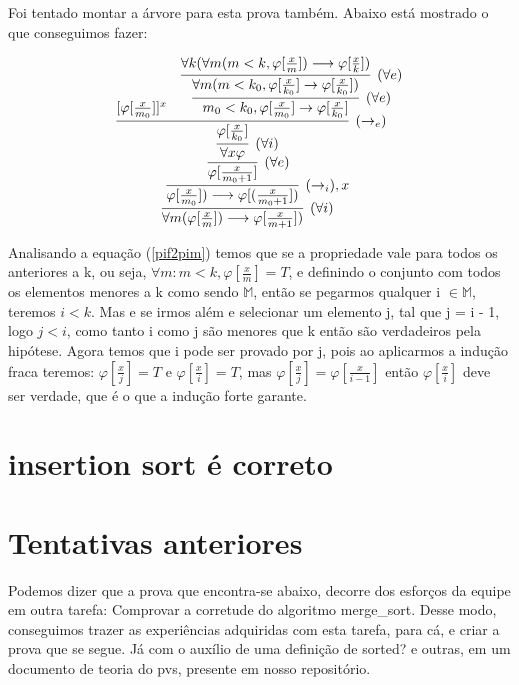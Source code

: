 \documentclass[a4paper, 10pt]{article}
\begin{document}
Foi tentado montar a árvore para esta prova também. Abaixo está mostrado o que conseguimos fazer:

$$
\infer[(\forall{i})] {\forall{m}(\varphi[\frac{x}{m}]) \longrightarrow \varphi[\frac{x}{m+1}])} {
    \infer[(\rightarrow_i), x] {\varphi[\frac{x}{m_0}]) \longrightarrow \varphi[(\frac{x}{m_0+1}])} {
        \infer[(\forall{e})] {\varphi[\frac{x}{m_0+1}]} {
            \infer[(\forall{i})] {\forall{x}\varphi} {
                \infer[(\rightarrow_e)] {\varphi[\frac{x}{k_0}]} {
                    [\varphi[\frac{x}{m_0}]]^x
                    & \infer[(\forall{e})] {m_0 < k_0, \varphi[\frac{x}{m_0}]\rightarrow\varphi[\frac{x}{k_0}]} {
                        \infer[(\forall{e})] {\forall{m}(m < k_0, \varphi[\frac{x}{k_0}]\rightarrow\varphi[\frac{x}{k_0}])} {
                            \forall{k}(\forall{m}(m < k, \varphi[\frac{x}{m}])\longrightarrow\varphi[\frac{x}{k}])
                        }
                    }
                }
            }
        }
    }
}
$$

Analisando a equação (\ref{pif2pim}) temos que se a propriedade vale para todos os anteriores a k, ou seja, $\forall{m: m < k}, \varphi[\frac{x}{m}] = T$, e definindo o conjunto com todos os elementos menores a k como sendo $\mathbb{M}$, então se pegarmos qualquer i $\in \mathbb{M}$, teremos $i < k$. Mas e se irmos além e selecionar um elemento j, tal que j = i - 1, logo $j < i$, como tanto i como j são menores que k então são verdadeiros pela hipótese.
Agora temos que i pode ser provado por j, pois ao aplicarmos a indução fraca teremos: $\varphi[\frac{x}{j}] = T$ e $\varphi[\frac{x}{i}] = T$, mas $\varphi[\frac{x}{j}] = \varphi[\frac{x}{i-1}]$ então $\varphi[\frac{x}{i}]$ deve ser verdade, que é o que a indução forte garante.

\section{insertion sort é correto}
\label{sec:insert}

\section{Tentativas anteriores}

Podemos dizer que a prova que encontra-se abaixo, decorre dos esforços da equipe em outra tarefa: Comprovar a corretude do algoritmo merge\_sort. Desse modo, conseguimos trazer as experiências adquiridas com esta tarefa, para cá, e criar a prova que se segue. Já com o auxílio de uma definição de sorted? e outras, em um documento de teoria do pvs, presente em nosso repositório.  
\end{document}
